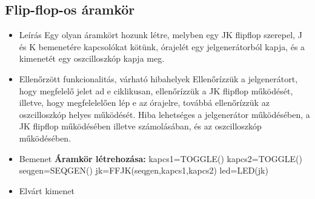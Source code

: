 \subsection{Flip-flop-os áramkör}
\begin{itemize}
\item Leírás\newline
Egy olyan áramkört hozunk létre, melyben egy JK flipflop szerepel, J és K bemenetére kapcsolókat kötünk, órajelét egy jelgenerátorból kapja, és a kimenetét egy oszcilloszkóp kapja meg.
\item Ellenőrzött funkcionalitás, várható hibahelyek\newline
Ellenőrízzük a jelgenerátort, hogy megfelelő jelet ad e ciklikusan, ellenőrízzük a JK flipflop működését, illetve, hogy megfelelelően lép e az órajelre, továbbá ellenőrízzük az oszcilloszkóp helyes működését. Hiba lehetséges a jelgenerátor működésében, a JK flipflop működésében illetve számolásában, és az oszcilloszkóp működésében.
\item Bemenet\newline
\newline
{\bf Áramkör létrehozása:}\newline
kapcs1=TOGGLE()\newline
kapcs2=TOGGLE()\newline
seqgen=SEQGEN()\newline
jk=FFJK(seqgen,kapcs1,kapcs2)\newline
led=LED(jk)\newline
\item Elvárt kimenet\newline
{}
\end{itemize}





